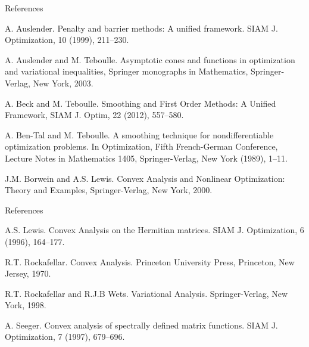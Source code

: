 \documentclass[aspectratio=169, dvipdfmx, 11pt]{beamer}
\begin{document}
\begin{frame}[t]{References}
  \begin{thebibliography}{99}
      A. Auslender. Penalty and barrier methods: A unified framework. SIAM J. Optimization, 10 (1999), 211--230.

    A. Auslender and M. Teboulle. Asymptotic cones and functions in optimization and variational inequalities, Springer monographs in Mathematics, Springer-Verlag, New York, 2003.

    A. Beck and M. Teboulle. Smoothing and First Order Methods: A Unified Framework, SIAM J. Optim, 22 (2012), 557--580.

    A. Ben-Tal and M. Teboulle. A smoothing technique for nondifferentiable optimization problems. In Optimization, Fifth French-German Conference, Lecture Notes in Mathematics 1405, Springer-Verlag, New York (1989), 1--11.

    J.M. Borwein and A.S. Lewis. Convex Analysis and Nonlinear Optimization: Theory and Examples, Springer-Verlag, New York, 2000.
    \end{thebibliography}
\end{frame}

\begin{frame}[t]{References}
  \begin{thebibliography}{99}
    A.S. Lewis. Convex Analysis on the Hermitian matrices. SIAM J. Optimization, 6 (1996), 164--177.

    R.T. Rockafellar. Convex Analysis. Princeton University Press, Princeton, New Jersey, 1970.

    R.T. Rockafellar and R.J.B Wets. Variational Analysis. Springer-Verlag, New York, 1998.

    A. Seeger. Convex analysis of spectrally defined matrix functions. SIAM J. Optimization, 7 (1997), 679--696.
  \end{thebibliography}
\end{frame}
\end{document}
